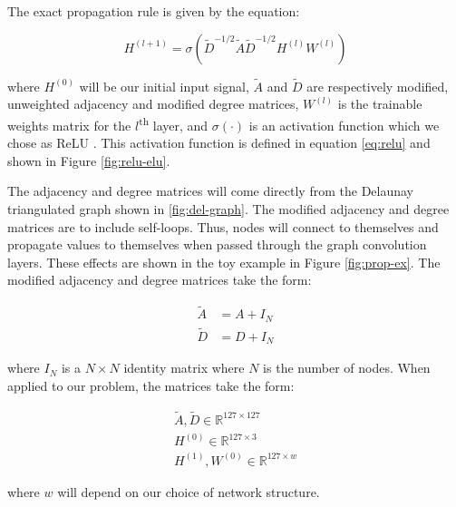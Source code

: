 \documentclass[../thesis.tex]{subfiles}
\begin{document}
The exact propagation rule is given by the equation:
\begin{linenomath}\begin{equation}\label{eq:conv}
H^{(l+1)} = \sigma\left( \tilde{D}^{-1/2} \tilde{A} \tilde{D}^{-1/2} H^{(l)} W^{(l)} \right)
\end{equation}\end{linenomath}
where $H^{(0)}$ will be our initial input signal, $\tilde{A}$ and $\tilde{D}$ are respectively modified, unweighted adjacency and modified degree matrices, $W^{(l)}$ is the trainable weights matrix for the $l$\textsuperscript{th} layer, and $\sigma(\cdot)$ is an activation function which we chose as ReLU \cite{GCNN_Kipf}.
This activation function is defined in equation \ref{eq:relu} and shown in Figure \ref{fig:relu-elu}.

\par The adjacency and degree matrices will come directly from the Delaunay triangulated graph shown in \ref{fig:del-graph}.
The modified adjacency and degree matrices are to include self-loops.
Thus, nodes will connect to themselves and propagate values to themselves when passed through the graph convolution layers.
These effects are shown in the toy example in Figure \ref{fig:prop-ex}.
The modified adjacency and degree matrices take the form:
\begin{linenomath}\begin{align*}
	\tilde{A} &= A + I_{N} \\
	\tilde{D} &= D + I_{N}
\end{align*}\end{linenomath}
where $I_{N}$ is a $N \times N$ identity matrix where $N$ is the number of nodes.
When applied to our problem, the matrices take the form:
\begin{linenomath}\begin{align*}
	\tilde{A}, \tilde{D} \in \mathbb{R}^{127 \times 127} \\
	H^{(0)} \in \mathbb{R}^{127 \times 3} \\
	H^{(1)}, W^{(0)} \in \mathbb{R}^{127 \times w}
\end{align*}\end{linenomath}
where $w$ will depend on our choice of network structure.
\end{document}
